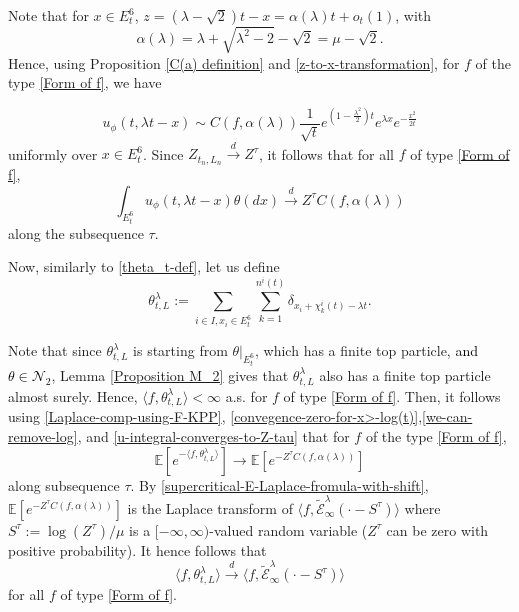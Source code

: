 \documentclass[a4paper,reqno]{amsart}%
\newcommand{\1}{\mathbf 1}
\theoremstyle{mine}
\numberwithin{theorem}{section}
\numberwithin{equation}{section}
\theoremstyle{remark}
\begin{document}
Note that for $x\in E_t^6$, $z = (\lambda -\sqrt{2}) t -x = \alpha(\lambda) t + o_t(1)$, with 
\[ \alpha(\lambda) = \lambda + \sqrt{\lambda^2 -2} - \sqrt{2} = \mu -\sqrt{2}.\] 
Hence,  using Proposition \ref{C(a) definition} and \eqref{z-to-x-transformation}, for $f$ of the type \eqref{Form of f}, we have 

\begin{equation}
    u_\phi(t, \lambda t -x) \sim C(f, \alpha(\lambda)) \frac{1}{\sqrt{t}}e^{(1-\frac{\lambda^2}{2})t}e^{\lambda x}e^{-\frac{x^2}{2t}}
\end{equation}
uniformly over $x\in E_t^6$. Since $Z_{t_n, L_n} \overset{d}{\to } Z^\tau$, it follows that for all $f$ of type \eqref{Form of f},
\begin{equation}\label{u-integral-converges-to-Z-tau}
    \int_{E_t^6} u_\phi(t, \lambda t-x) \theta(dx) \overset{d}{\to} Z^{\tau} C(f, \alpha(\lambda))
\end{equation} 
along the subsequence $\tau$. 

Now, similarly to \eqref{theta_t-def}, let us define 
\begin{equation} \label{theta-t-L-def}
        \theta_{t,L}^\lambda:= \sum\limits_{i \in I, x_i \in E_t^6} \sum\limits_{k=1}^{n^i(t)} \delta_{x_i+\chi_k^i(t)-\lambda t}. 
    \end{equation}
    
Note that since $\theta_{t,L}^\lambda$ is starting from $\theta|_{E_t^6}$, which has a finite top particle, \textcolor{black}{and $\theta \in \mathcal N_2$}, Lemma \ref{Proposition M_2} gives that $\theta_{t,L}^\lambda$ also has a finite top particle almost surely. Hence, $\langle f,\theta_{t,L}^\lambda \rangle <\infty$ a.s. for $f$ of type \eqref{Form of f}. Then, it follows using \eqref{Laplace-comp-using-F-KPP}, \eqref{convegence-zero-for-x>-log(t)},\eqref{we-can-remove-log}, and \eqref{u-integral-converges-to-Z-tau} that for $f$ of the type \eqref{Form of f}, 
\begin{equation}
    \mathbb{E}[e^{-\langle f, \theta_{t,L}^\lambda \rangle}] \to  \mathbb{E}[e^{-Z^{\tau} C(f, \alpha(\lambda))}]
\end{equation}
along subsequence $\tau$. By \eqref{supercritical-E-Laplace-fromula-with-shift}, $\mathbb{E}[e^{-Z^{\tau} C(f, \alpha(\lambda))}]$ is the Laplace transform of $\langle f, \widetilde{\mathcal E}_\infty^\lambda(\cdot -S^\tau) \rangle$ where $S^\tau := \log (Z^\tau)/\mu$ is a $[-\infty, \infty)$-valued random variable ($Z^\tau$ can be zero with positive probability). It hence follows that 
\begin{equation}\label{convergence-conclusion}
    \langle f, \theta_{t,L}^\lambda \rangle \overset{d}{\to} \langle f, \widetilde{\mathcal E}_\infty^\lambda(\cdot -S^\tau) \rangle
\end{equation} 
for all $f$ of type \eqref{Form of f}.
\end{document}
